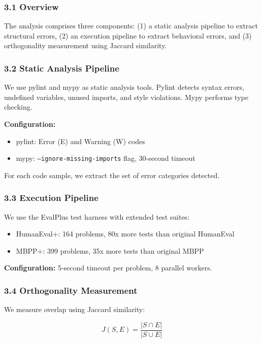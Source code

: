 
\subsubsection{3.1 Overview}

The analysis comprises three components: (1) a static analysis pipeline to extract structural errors, (2) an execution pipeline to extract behavioral errors, and (3) orthogonality measurement using Jaccard similarity.

\subsubsection{3.2 Static Analysis Pipeline}

We use pylint and mypy as static analysis tools. Pylint detects syntax errors, undefined variables, unused imports, and style violations. Mypy performs type checking.

\textbf{Configuration:}
\begin{itemize}
\item pylint: Error (E) and Warning (W) codes
\item mypy: \texttt{--ignore-missing-imports} flag, 30-second timeout
\end{itemize}

For each code sample, we extract the set of error categories detected.

\subsubsection{3.3 Execution Pipeline}

We use the EvalPlus test harness with extended test suites:
\begin{itemize}
\item HumanEval+: 164 problems, 80x more tests than original HumanEval
\item MBPP+: 399 problems, 35x more tests than original MBPP
\end{itemize}

\textbf{Configuration:} 5-second timeout per problem, 8 parallel workers.

\subsubsection{3.4 Orthogonality Measurement}

We measure overlap using Jaccard similarity:

$$J(S, E) = \frac{|S \cap E|}{|S \cup E|}$$

